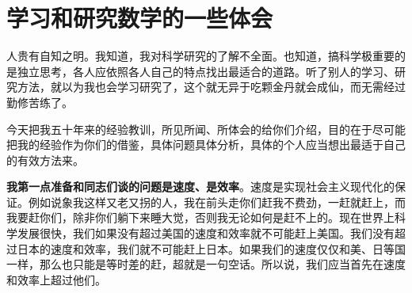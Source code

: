 \documentclass[twoside,openright,headings=optiontohead]{ctexbook} %
\begin{document}
	\frontmatter
%			
\newpage
{\color{TEXTColor}
		\tableofcontents
	\newpage
	\mainmatter

\mainmatter

\chapter*{学习和研究数学的一些体会}\label{ux5b66ux4e60ux548cux7814ux7a76ux6570ux5b66ux7684ux4e00ux4e9bux4f53ux4f1a}

人贵有自知之明。我知道，我对科学研究的了解不全面。也知道，搞科学极重要的是独立思考，各人应依照各人自己的特点找出最适合的道路。听了别人的学习、研究方法，就以为我也会学习研究了，这个就无异于吃颗金丹就会成仙，而无需经过勤修苦练了。

今天把我五十年来的经验教训，所见所闻、所体会的给你们介绍，目的在于尽可能把我的经验作为你们的借鉴，具体问题具体分析，具体的个人应当想出最适于自己的有效方法来。

\textbf{我第一点准备和同志们谈的问题是速度、是效率}。速度是实现社会主义现代化的保证。例如说象我这样又老又拐的人，我在前头走你们赶我不费劲，一赶就赶上，而我要赶你们，除非你们躺下来睡大觉，否则我无论如何是赶不上的。现在世界上科学发展很快，我们如果没有超过美国的速度和效率就不可能赶上美国。我们没有超过日本的速度和效率，我们就不可能赶上日本。如果我们的速度仅仅和美、日等国一样，那么也只能是等时差的赶，超就是一句空话。所以说，我们应当首先在速度和效率上超过他们。

}
\end{document}
